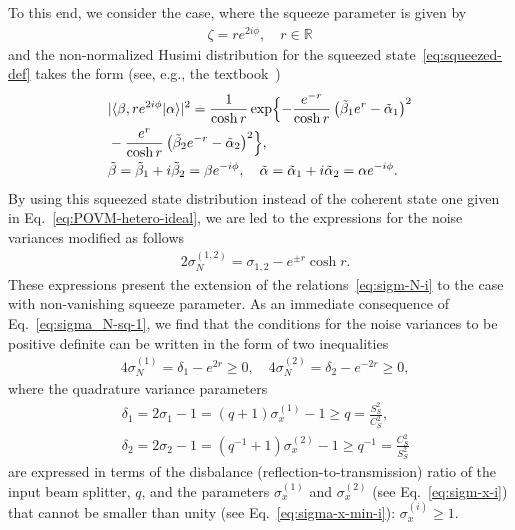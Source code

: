 \documentclass[%
reprint,
superscriptaddress,
 amsmath,amssymb,amsfonts,
 aps,
 pra,
 longbibliography
]{revtex4-2}
\begin{document}
To this end, we consider the case, where
the squeeze parameter is given by
\begin{align}
  \label{eq:sq-param}
  \zeta=r e^{2 i \phi},\quad
  r\in\mathbb{R}
\end{align}
and the non-normalized Husimi distribution
for the squeezed state~\eqref{eq:squeezed-def} takes
the form
(see, e.g., the textbook~\cite{Gerry:bk:2005})
\begin{align}
\label{eq:squeezed-Q}
  &
    |\langle\beta,r e^{2 i \phi}|\alpha\rangle|^2=\frac{1}{\cosh r}
    \exp\Bigl\{-
    \frac{e^{-r}}{\cosh r}{}
    \left(\tilde{\beta}_1e^{r}-\tilde{\alpha}_1\right)^2
    \notag
  \\
    &-\frac{e^{r}}{\cosh r}{}\left(\tilde{\beta}_2e^{{-r}}-\tilde{\alpha}_2\right)^2
      \Bigr\},
  \\
  &
    \label{eq:tbeta-alpha}
    \tilde{\beta}=\tilde{\beta}_1+ i \tilde{\beta}_2=\beta e^{-i\phi},
    \quad
    \tilde{\alpha}=\tilde{\alpha}_1+ i \tilde{\alpha}_2=\alpha e^{-i\phi}.
\end{align}
By using
this squeezed state distribution instead
of the coherent state one 
given in Eq.~\eqref{eq:POVM-hetero-ideal},
we are led to the expressions for
the noise variances modified as follows
\begin{align}
  \label{eq:sigma_N-sq-1}
  &
    2\sigma_N^{(1,2)}=\sigma_{1,2}-e^{\pm r}\cosh r.
\end{align}
These expressions present the
extension of the relations~\eqref{eq:sigm-N-i}
to the case with non-vanishing squeeze parameter.
As an immediate consequence of Eq.~\eqref{eq:sigma_N-sq-1},
we find that
the conditions for the noise variances to be positive definite
can be written in the form of two inequalities 
\begin{align}
  \label{eq:sigma_N-sq-2}
  &
    4\sigma_N^{(1)}=\delta_1-e^{2r}\ge 0,
    \quad
    4\sigma_N^{(2)}=\delta_2-e^{-2r}\ge 0,
\end{align}
where the quadrature variance parameters
\begin{subequations}
  \label{eq:delta_12}
\begin{align}
  \label{eq:delta_1}
  &
    \delta_1=2\sigma_1-1=(q+1)\sigma_x^{(1)}-1\ge q=\frac{S_S^2}{C_S^2},
  \\
  &
    \label{eq:delta_2}
    \delta_2=2\sigma_2-1=(q^{-1}+1)\sigma_x^{(2)}-1\ge q^{-1}=\frac{C_S^2}{S_S^2}
\end{align}
\end{subequations}
are expressed in terms of
the disbalance
(reflection-to-transmission)
ratio of the input beam splitter, $q$,
and the parameters $\sigma_{x}^{(1)}$
and $\sigma_{x}^{(2)}$
(see Eq.~\eqref{eq:sigm-x-i})
that cannot be smaller than unity
(see Eq.~\eqref{eq:sigma-x-min-i}): $\sigma_x^{(i)}\ge 1$.
\end{document}
